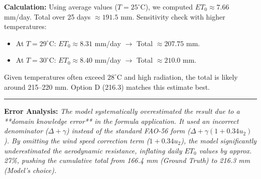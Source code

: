 \begin{ReasoningBox}[title=Domain Knowledge Error]
    \textbf{Calculation:}
    Using average values ($T=25^\circ$C), we computed $ET_0 \approx 7.66$ mm/day. Total over 25 days $\approx 191.5$ mm.
    Sensitivity check with higher temperatures:
    \begin{itemize}
        \item At $T=29^\circ$C: $ET_0 \approx 8.31$ mm/day $\rightarrow$ Total $\approx 207.75$ mm.
        \item At $T=30^\circ$C: $ET_0 \approx 8.40$ mm/day $\rightarrow$ Total $\approx 210.0$ mm.
    \end{itemize}
    Given temperatures often exceed $28^\circ$C and high radiation, the total is likely around 215--220 mm. Option D (216.3) matches this estimate best. \\
    \par            %
    \hrule          %
    \vspace{0.8em}  %
    \textbf{Error Analysis:} \textit{The model systematically overestimated the result due to a **domain knowledge error** in the formula application. It used an incorrect denominator ($\Delta + \gamma$) instead of the standard FAO-56 form ($\Delta + \gamma(1 + 0.34u_2)$). By omitting the wind speed correction term ($1 + 0.34u_2$), the model significantly underestimated the aerodynamic resistance, inflating daily $ET_0$ values by approx. 27\%, pushing the cumulative total from 166.4 mm (Ground Truth) to 216.3 mm (Model's choice).}
\end{ReasoningBox}